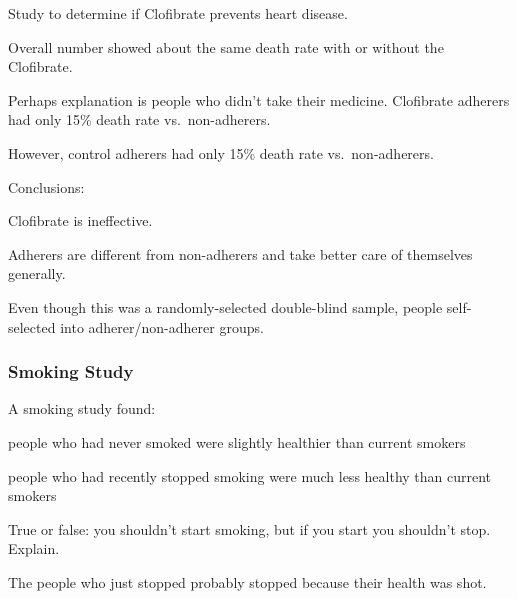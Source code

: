 \documentclass[landscape]{exam}
\begin{document}
  \begin{itemize*}
    \item Study to determine if Clofibrate prevents heart disease.

    \item Overall number showed about the same death rate with or without the
      Clofibrate.

    \item Perhaps explanation is people who didn't take their medicine.
      Clofibrate adherers had only 15\% death rate vs.\ non-adherers.

    \item However, control adherers had only 15\% death rate vs.\ non-adherers.

    \item Conclusions:
      \begin{itemize*}
        \item Clofibrate is ineffective.

        \item Adherers are different from non-adherers and take better care of
          themselves generally.

        \item Even though this was a randomly-selected double-blind sample,
          people self-selected into adherer/non-adherer groups.

      \end{itemize*}

  \end{itemize*}

  \subsubsection{Smoking Study}
  A smoking study found:
  \begin{itemize*}
    \item people who had never smoked were slightly healthier than current
      smokers
    \item people who had recently stopped smoking were much less healthy than
      current smokers
  \end{itemize*}

  True or false: you shouldn't start smoking, but if you start you shouldn't
  stop.  Explain.

  \begin{solution}
    The people who just stopped probably stopped because their health was shot.
  \end{solution}
\end{document}

